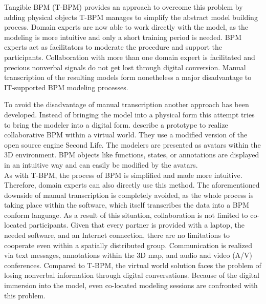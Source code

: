 Tangible BPM (T-BPM) provides an approach to overcome this problem
by adding physical objects T-BPM manages to simplify the abstract model building process. 
Domain experts are now able to work directly with the model, as the modeling is more intuitive and only a short training 
period is needed. BPM experts act as facilitators to moderate the procedure and support the participants.
Collaboration with more than one domain expert is facilitated and precious nonverbal signals do not get lost through 
digital conversion. Manual transcription of the resulting models form nonetheless a major disadvantage to IT-supported
BPM modeling processes. 


To avoid the disadvantage of manual transcription another approach has been developed. Instead of bringing the model
into a physical form this attempt tries to bring the modeler into a digital form.  describe a prototype
to realize collaborative BPM within a virtual world. They use a modified version of the open source engine Second Life.
The modelers are presented as avatars within the 3D environment. BPM objects like functions, states, or annotations are
displayed in an intuitive way and can easily be modified by the avatars. \\
As with T-BPM, the process of BPM is simplified and made more intuitive. Therefore, domain experts can also directly use this method.
The aforementioned downside of manual transcription is completely avoided, as the whole process is taking place within
the software, which itself transcribes the data into a BPM conform language. As a result of this situation, collaboration
is not limited to co-located participants. Given that every partner is provided with a laptop, the needed software, and an Internet 
connection, there are no limitations to cooperate even within a spatially distributed group. Communication is realized via text
messages, annotations within the 3D map, and audio and video (A/V) conferences. Compared to T-BPM, the virtual world solution faces the 
problem of losing nonverbal information through digital conversations. Because of the digital immersion into the model, even 
co-located modeling sessions are confronted with this problem. 


